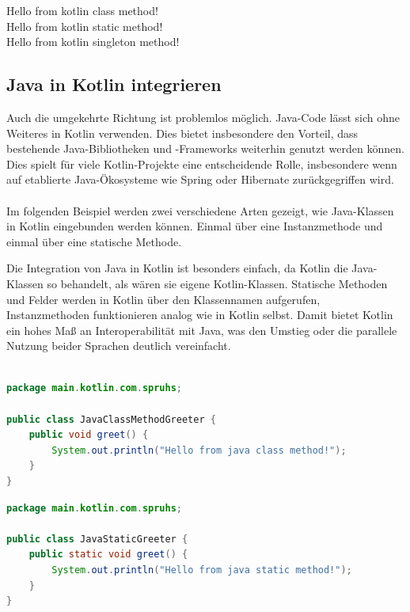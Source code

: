 \documentclass[11pt]{article}
\begin{document}
    \begin{tcolorbox}[colback=black!5!white, colframe=black, title=Ausgabe]
        Hello from kotlin class method!\\
        Hello from kotlin static method!\\
        Hello from kotlin singleton method!
    \end{tcolorbox}
    
    \subsection{Java in Kotlin integrieren}
    Auch die umgekehrte Richtung ist problemlos möglich.
    Java-Code lässt sich ohne Weiteres in Kotlin verwenden.
    Dies bietet insbesondere den Vorteil, dass bestehende Java-Bibliotheken und -Frameworks weiterhin genutzt werden können.
    Dies spielt für viele Kotlin-Projekte eine entscheidende Rolle, insbesondere wenn auf etablierte Java-Ökosysteme wie Spring oder Hibernate zurückgegriffen wird.\\
    \\
    Im folgenden Beispiel werden zwei verschiedene Arten gezeigt, wie Java-Klassen in Kotlin eingebunden werden können.
    Einmal über eine Instanzmethode und einmal über eine statische Methode.

    Die Integration von Java in Kotlin ist besonders einfach, da Kotlin die Java-Klassen so behandelt, als wären sie eigene Kotlin-Klassen.
    Statische Methoden und Felder werden in Kotlin über den Klassennamen aufgerufen, Instanzmethoden funktionieren analog wie in Kotlin selbst.
    Damit bietet Kotlin ein hohes Maß an Interoperabilität mit Java, was den Umstieg oder die parallele Nutzung beider Sprachen deutlich vereinfacht.\\
    \\

    \begin{lstlisting}[language=Java, caption={JavaClassMethodGreeter.java}]
package main.kotlin.com.spruhs;

public class JavaClassMethodGreeter {
    public void greet() {
        System.out.println("Hello from java class method!");
    }
}
    \end{lstlisting}

    \begin{lstlisting}[language=Java, caption={JavaStaticGreeter.java}]
package main.kotlin.com.spruhs;

public class JavaStaticGreeter {
    public static void greet() {
        System.out.println("Hello from java static method!");
    }
}

    \end{lstlisting}
\end{document}
